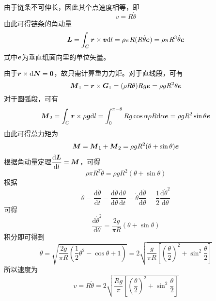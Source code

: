 \begin{solution}
由于链条不可伸长，因此其个点速度相等，即
\begin{equation*}
	v = R\dot{\theta}
\end{equation*}
由此可得链条的角动量
\begin{equation*}
	\boldsymbol{L} = \int_C \boldsymbol{r} \times \boldsymbol{v} \mathrm{d} l = \rho \pi R (R\dot{\theta} \boldsymbol{e}) = \rho \pi R^3 \dot{\theta} \boldsymbol{e}
\end{equation*}
式中$\boldsymbol{e}$为垂直纸面向里的单位矢量。

由于$\boldsymbol{r} \times \mathrm{d} \boldsymbol{N} = \boldsymbol{0}$，故只需计算重力力矩。对于直线段，可有
\begin{equation*}
	\boldsymbol{M}_1 = \boldsymbol{r} \times \boldsymbol{G}_1 = (\rho R\theta) Rg\boldsymbol{e} = \rho gR^2 \theta \boldsymbol{e}
\end{equation*}
对于圆弧段，可有
\begin{equation*}
	\boldsymbol{M}_2 = \int_C \boldsymbol{r} \times \rho\boldsymbol{g} \mathrm{d} l = \int_0^{\pi-\theta} Rg\cos \alpha \rho R \mathrm{d} \alpha \boldsymbol{e} = \rho gR^2 \sin \theta \boldsymbol{e}
\end{equation*}
由此可得总力矩为
\begin{equation*}
	\boldsymbol{M} = \boldsymbol{M}_1 + \boldsymbol{M}_2 = \rho gR^2 (\theta+\sin \theta)\boldsymbol{e}
\end{equation*}
根据角动量定理$\dfrac{\mathrm{d} \boldsymbol{L}}{\mathrm{d} t} = \boldsymbol{M}$，可得
\begin{equation*}
	\rho \pi R^3 \ddot{\theta} = \rho gR^2 (\theta+\sin \theta)
\end{equation*}
根据
\begin{equation*}
	\ddot{\theta} = \frac{\mathrm{d} \dot{\theta}}{\mathrm{d} t} = \frac{\mathrm{d} \dot{\theta}}{\mathrm{d} \theta} \frac{\mathrm{d} \theta}{\mathrm{d} t} = \dot{\theta} \frac{\mathrm{d} \dot{\theta}}{\mathrm{d} \theta} = \frac12 \frac{\mathrm{d} \dot{\theta}^2}{\mathrm{d} \theta}
\end{equation*}
可得
\begin{equation*}
	\frac{\mathrm{d} \dot{\theta}^2}{\mathrm{d} \theta} = \frac{2g}{\pi R}(\theta +\sin \theta)
\end{equation*}
积分即可得到
\begin{equation*}
	\dot{\theta} = \sqrt{\frac{2g}{\pi R} \left(\frac12 \theta^2 - \cos \theta + 1\right)} = 2\sqrt{\frac{g}{\pi R}\left[\left(\frac{\theta}{2}\right)^2+ \sin^2 \frac{\theta}{2}\right]}
\end{equation*}
所以速度为
\begin{equation*}
	v = R\dot{\theta} = 2\sqrt{\frac{Rg}{\pi}\left[\left(\frac{\theta}{2}\right)^2+ \sin^2 \frac{\theta}{2}\right]}
\end{equation*}


\end{solution}
